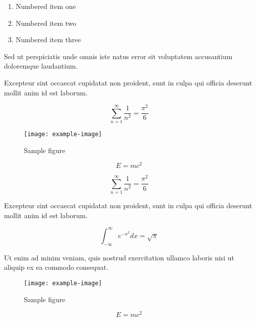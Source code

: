 \documentclass{article}
\begin{document}

\begin{enumerate}
\item Numbered item one
\item Numbered item two
\item Numbered item three
\end{enumerate}

Sed ut perspiciatis unde omnis iste natus error sit voluptatem accusantium doloremque laudantium.

Excepteur sint occaecat cupidatat non proident, sunt in culpa qui officia deserunt mollit anim id est laborum.

\begin{equation}
    \sum_{n=1}^{\infty} \frac{1}{n^2} = \frac{\pi^2}{6}
\end{equation}

\begin{figure}[h]
    \centering
    \texttt{[image: example-image]}
    \caption{Sample figure}
    \label{fig:sample}
\end{figure}

\begin{equation}
    E = mc^2
\end{equation}

\begin{equation}
    \sum_{n=1}^{\infty} \frac{1}{n^2} = \frac{\pi^2}{6}
\end{equation}

Excepteur sint occaecat cupidatat non proident, sunt in culpa qui officia deserunt mollit anim id est laborum.

\begin{equation}
    \int_{-\infty}^{\infty} e^{-x^2} dx = \sqrt{\pi}
\end{equation}


Ut enim ad minim veniam, quis nostrud exercitation ullamco laboris nisi ut aliquip ex ea commodo consequat.

\begin{figure}[h]
    \centering
    \texttt{[image: example-image]}
    \caption{Sample figure}
    \label{fig:sample}
\end{figure}

\begin{equation}
    E = mc^2
\end{equation}
\end{document}
